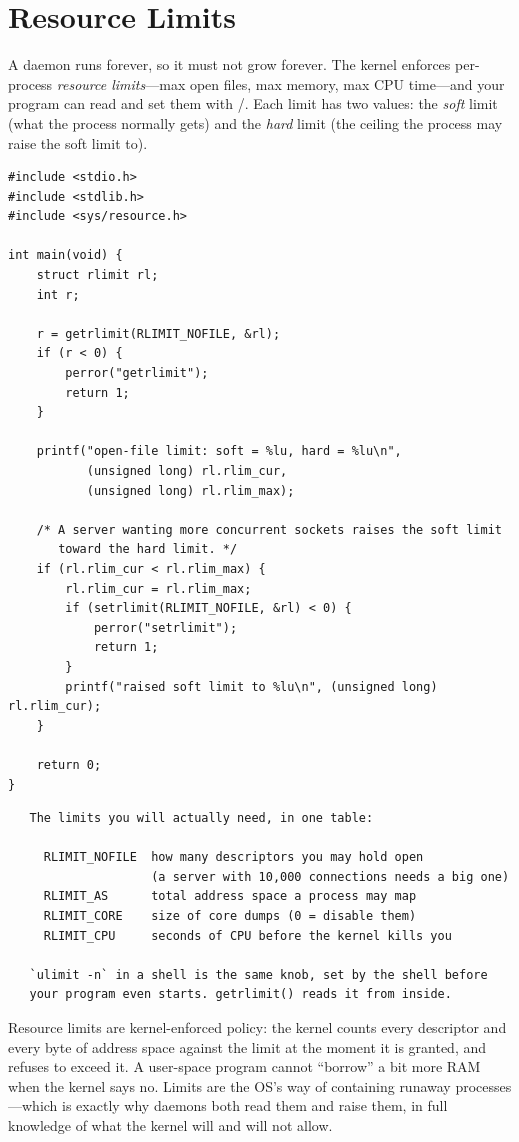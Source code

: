 \section{Resource Limits}

A daemon runs forever, so it must not grow forever. The kernel enforces
per-process \emph{resource limits}---max open files, max memory, max
CPU time---and your program can read and set them with
/. Each limit has two values: the
\emph{soft} limit (what the process normally gets) and the \emph{hard}
limit (the ceiling the process may raise the soft limit to).

\begin{lstlisting}[caption={Reading and raising the open-file limit.}]
#include <stdio.h>
#include <stdlib.h>
#include <sys/resource.h>

int main(void) {
    struct rlimit rl;
    int r;

    r = getrlimit(RLIMIT_NOFILE, &rl);
    if (r < 0) {
        perror("getrlimit");
        return 1;
    }

    printf("open-file limit: soft = %lu, hard = %lu\n",
           (unsigned long) rl.rlim_cur,
           (unsigned long) rl.rlim_max);

    /* A server wanting more concurrent sockets raises the soft limit
       toward the hard limit. */
    if (rl.rlim_cur < rl.rlim_max) {
        rl.rlim_cur = rl.rlim_max;
        if (setrlimit(RLIMIT_NOFILE, &rl) < 0) {
            perror("setrlimit");
            return 1;
        }
        printf("raised soft limit to %lu\n", (unsigned long) rl.rlim_cur);
    }

    return 0;
}
\end{lstlisting}

\begin{verbatim}
   The limits you will actually need, in one table:

     RLIMIT_NOFILE  how many descriptors you may hold open
                    (a server with 10,000 connections needs a big one)
     RLIMIT_AS      total address space a process may map
     RLIMIT_CORE    size of core dumps (0 = disable them)
     RLIMIT_CPU     seconds of CPU before the kernel kills you

   `ulimit -n` in a shell is the same knob, set by the shell before
   your program even starts. getrlimit() reads it from inside.
\end{verbatim}

\begin{osconcept}
Resource limits are kernel-enforced policy: the kernel counts every
descriptor and every byte of address space against the limit at the
moment it is granted, and refuses to exceed it. A user-space program
cannot ``borrow'' a bit more RAM when the kernel says no. Limits are
the OS's way of containing runaway processes---which is exactly why
daemons both read them and raise them, in full knowledge of what the
kernel will and will not allow.
\end{osconcept}


